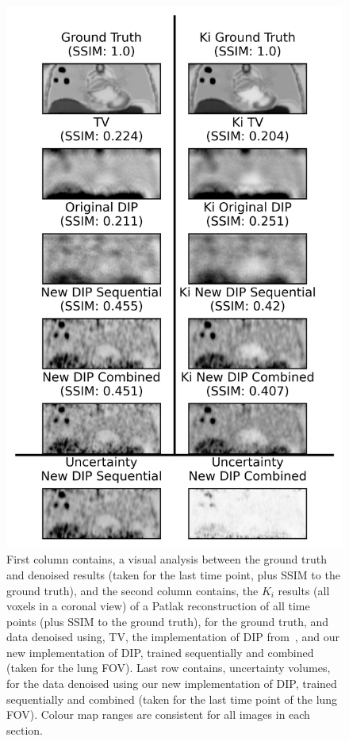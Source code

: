         \begin{figure}
            \centering
            
            \includegraphics[width=0.7\linewidth]{figures/deep_image_prior_results_visual_analysis.png}
            
            \captionsetup{singlelinecheck=false}
            \caption{
                First column contains, a visual analysis between the ground truth and denoised results (taken for the last time point, plus \gls{SSIM} to the ground truth), and the second column contains, the $K_i$ results (all voxels in a coronal view) of a Patlak reconstruction of all time points (plus \gls{SSIM} to the ground truth), for the ground truth, and data denoised using, \gls{TV}, the implementation of \gls{DIP} from~\parencite{Gong2019PETPrior}, and our new implementation of \gls{DIP}, trained sequentially and combined (taken for the lung \gls{FOV}). Last row contains, uncertainty volumes, for the data denoised using our new implementation of \gls{DIP}, trained sequentially and combined (taken for the last time point of the lung \gls{FOV}). Colour map ranges are consistent for all images in each section.
            }
            \label{fig:pseudo_bayesian_dip_denoising_as_a_preprocessing_step_for_kinetic_modelling_in_dynamic_pet_appendix_results_visual_analysis}
        \end{figure}
        
